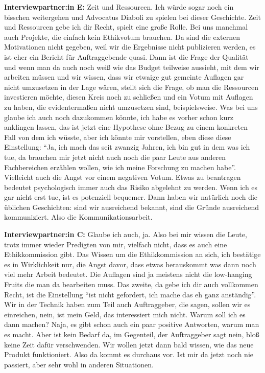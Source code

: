 \documentclass[a4paper,12pt,twoside]{scrreprt}
\begin{document}
\textbf{Interviewpartner:in E:} Zeit und Ressourcen. Ich würde sogar noch ein bisschen weitergehen und Advocatus Diaboli zu spielen bei dieser Geschichte. Zeit und Ressourcen gebe ich dir Recht, spielt eine große Rolle. Bei uns manchmal auch Projekte, die einfach kein Ethikvotum brauchen. Da sind die externen Motivationen nicht gegeben, weil wir die Ergebnisse nicht publizieren werden, es ist eher ein Bericht für Auftraggebende quasi. Dann ist die Frage der Qualität und wenn man da auch noch weiß wie das Budget teilweise aussieht, mit dem wir arbeiten müssen und wir wissen, dass wir etwaige gut gemeinte Auflagen gar nicht umzusetzen in der Lage wären, stellt sich die Frage, ob man die Ressourcen investieren möchte, diesen Kreis noch zu schließen und ein Votum mit Auflagen zu haben, die evidentermaßen nicht umzusetzen sind, beispielsweise. Was bei uns glaube ich auch noch dazukommen könnte, ich habe es vorher schon kurz anklingen lassen, das ist jetzt eine Hypothese ohne Bezug zu einem konkreten Fall von dem ich wüsste, aber ich könnte mir vorstellen, eben diese diese Einstellung: \enquote{Ja, ich mach das seit zwanzig Jahren, ich bin gut in dem was ich tue, da brauchen mir jetzt nicht auch noch die paar Leute aus anderen Fachbereichen erzählen wollen, wie ich meine Forschung zu machen habe}. Vielleicht auch die Angst vor einem negativen Votum. Etwas zu beantragen bedeutet psychologisch immer auch das Risiko abgelehnt zu werden. Wenn ich es gar nicht erst tue, ist es potenziell bequemer. Dann haben wir natürlich noch die üblichen Geschichten: sind wir ausreichend bekannt, sind die Gründe ausreichend kommuniziert. Also die Kommunikationsarbeit.

\textbf{Interviewpartner:in C:} Glaube ich auch, ja. Also bei mir wissen die Leute, trotz immer wieder Predigten von mir, vielfach nicht, dass es auch eine Ethikkommission gibt. Das Wissen um die Ethikkommission an sich, ich bestätige es in Wirklichkeit nur, die Angst davor, dass etwas herauskommt was dann noch viel mehr Arbeit bedeutet. Die Auflagen sind ja meistens nicht die low-hanging Fruits die man da bearbeiten muss. Das zweite, da gebe ich dir auch vollkommen Recht, ist die Einstellung \enquote{ist nicht gefordert, ich mache das eh ganz anständig}. Wir in der Technik haben zum Teil auch Auftraggeber, die sagen, sollen wir es einreichen, nein, ist mein Geld, das interessiert mich nicht. Warum soll ich es dann machen? Naja, es gibt schon auch ein paar positive Antworten, warum man es macht. Aber ist kein Bedarf da, im Gegenteil, der Auftraggeber sagt nein, bloß keine Zeit dafür verschwenden. Wir wollen jetzt dann bald wissen, wie das neue Produkt funktioniert. Also da kommt es durchaus vor. Ist mir da jetzt noch nie passiert, aber sehr wohl in anderen Situationen.
\end{document}
